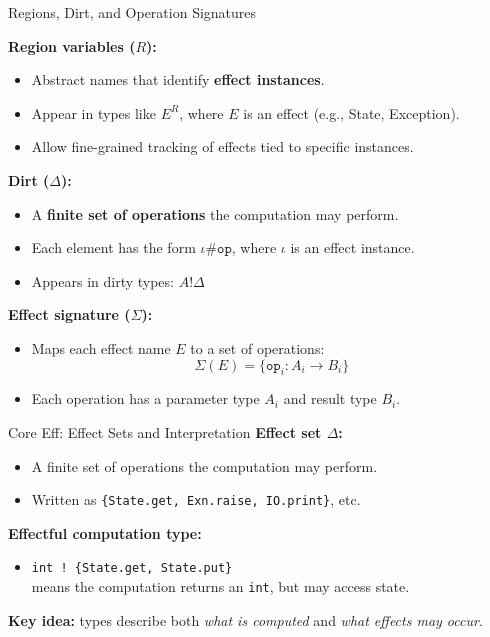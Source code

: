 \begin{frame}{Regions, Dirt, and Operation Signatures}

\textbf{Region variables (\( R \)):}
\begin{itemize}
  \item Abstract names that identify \textbf{effect instances}.
  \item Appear in types like \( E^R \), where \( E \) is an effect (e.g., State, Exception).
  \item Allow fine-grained tracking of effects tied to specific instances.
\end{itemize}

\vspace{1em}
\textbf{Dirt (\( \Delta \)):}
\begin{itemize}
  \item A \textbf{finite set of operations} the computation may perform.
  \item Each element has the form \( \iota \# \texttt{op} \), where \( \iota \) is an effect instance.
  \item Appears in dirty types: \( A ! \Delta \)
\end{itemize}

\vspace{1em}
\textbf{Effect signature (\( \Sigma \)):}
\begin{itemize}
  \item Maps each effect name \( E \) to a set of operations:
  \[
    \Sigma(E) = \{ \texttt{op}_i : A_i \rightarrow B_i \}
  \]
  \item Each operation has a parameter type \( A_i \) and result type \( B_i \).
\end{itemize}

\end{frame}

\begin{frame}{Core Eff: Effect Sets and Interpretation}
\textbf{Effect set $\Delta$:}
\begin{itemize}
  \item A finite set of operations the computation may perform.
  \item Written as \texttt{\{State.get, Exn.raise, IO.print\}}, etc.
\end{itemize}

\vspace{1em}
\textbf{Effectful computation type:}
\begin{itemize}
  \item \texttt{int ! \{State.get, State.put\}} \\
    means the computation returns an \texttt{int}, but may access state.
\end{itemize}

\vspace{1em}
\textbf{Key idea:} types describe both \textit{what is computed} and \textit{what effects may occur}.
\end{frame}

